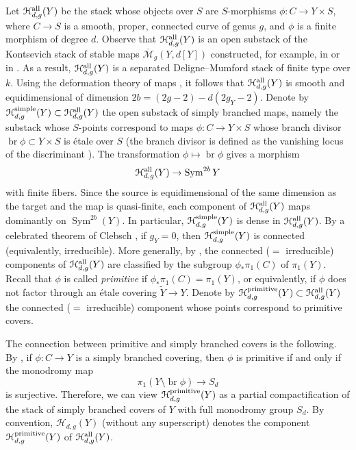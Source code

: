 \documentclass[11 pt]{amsart}
\renewcommand{\k}{k}
\DeclareMathOperator{\br}{br}
\providecommand {\from}{{\colon}}
\providecommand{\Sym}{\operatorname{Sym}}
\numberwithin{equation}{section}
\begin{document}
Let $\mathcal H_{d,g}^{\rm all}(Y)$ be the stack whose objects over $S$ are $S$-morphisms $\phi \from C \to Y \times S$, where $C \to S$ is a smooth, proper, connected curve of genus $g$, and $\phi$ is a finite morphism of degree $d$.
Observe that $\mathcal H_{d,g}^{\rm all}(Y)$ is an open substack of the Kontsevich stack of stable maps $\overline {\mathcal M}_g(Y, d[Y])$ constructed, for example, in \cite{ful.pan:97} or in \cite{beh.man:96}.
As a result, $\mathcal H_{d,g}^{\rm all}(Y)$ is a separated Deligne--Mumford stack of finite type over $\k$.
Using the deformation theory of maps \cite[Example~3.4.14]{ser:06}, it follows that $\mathcal H_{d,g}^{\rm all}(Y)$ is smooth and equidimensional of dimension $2b = (2g-2)-d(2g_Y-2)$.
Denote by $\mathcal H_{d,g}^{\rm simple}(Y) \subset \mathcal H_{d,g}^{\rm all}(Y)$ the open substack of simply branched maps, namely the substack whose $S$-points correspond to maps $\phi \from C \to Y \times S$ whose branch divisor $\br \phi \subset Y \times S$ is \'etale over $S$ (the branch divisor is defined as the vanishing locus of the discriminant \cite[\href{http://stacks.math.columbia.edu/tag/0BVH}{Tag 0BVH}]{sta:17}).
The transformation $\phi \mapsto \br\phi$ gives a morphism
\[ \mathcal H_{d,g}^{\rm all}(Y) \to \Sym^{2b} Y\]
with finite fibers.
Since the source is equidimensional of the same dimension as the target and the map is quasi-finite, each component of $\mathcal H_{d,g}^{\rm all}(Y)$ maps dominantly on $\Sym^{2b}(Y)$.
In particular, $\mathcal H_{d,g}^{\rm simple}(Y)$ is dense in $\mathcal H_{d,g}^{\rm all}(Y)$.
By a celebrated theorem of Clebsch \cite{cle:73}, if $g_Y = 0$, then $\mathcal H_{d,g}^{\rm simple}(Y)$ is connected (equivalently, irreducible).
More generally, by \cite[Theorem~9.2]{gab.kaz:87}, the connected ($=$ irreducible) components of $\mathcal H_{d,g}^{\rm all}(Y)$ are classified by the subgroup $\phi_* \pi_1(C)$ of $\pi_1(Y)$.
Recall that $\phi$ is called \emph{primitive} if $\phi_* \pi_1(C) = \pi_1(Y)$, or equivalently, if $\phi$ does not factor through an \'etale covering $\widetilde Y \to Y$.
Denote by $\mathcal H_{d,g}^{\rm primitive}(Y) \subset \mathcal H_{d,g}^{\rm all}(Y)$ the connected ($=$ irreducible) component whose points correspond to primitive covers.

The connection between primitive and simply branched covers is the following.
By \cite[Proposition~2.5]{ber.edm:84}, if $\phi \from C \to Y$ is a simply branched covering, then $\phi$ is primitive if and only if the monodromy map
\[ \pi_1(Y \setminus \br \phi) \to S_d \]
is surjective.
Therefore, we can view $\mathcal H_{d,g}^{\rm primitive}(Y)$ as a partial compactification of the stack of simply branched covers of $Y$ with full monodromy group $S_d$.
By convention, $\mathcal H_{d,g}(Y)$ (without any superscript) denotes the component $\mathcal H_{d,g}^{\rm primitive}(Y)$ of $\mathcal H_{d,g}^{\rm all}(Y)$.
\end{document}
